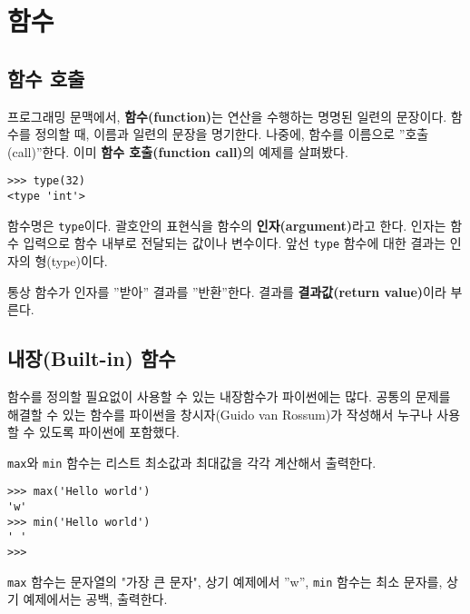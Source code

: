 
\chapter{함수}
\label{funcchap}

\section{함수 호출}
\label{functionchap}

프로그래밍 문맥에서, {\bf 함수(function)}는 연산을 수행하는 명명된 일련의 문장이다. 
함수를 정의할 때, 이름과 일련의 문장을 명기한다. 
나중에, 함수를 이름으로 ''호출(call)''한다.
이미 {\bf 함수 호출(function call)}의 예제를 살펴봤다.

\beforeverb
\begin{verbatim}
>>> type(32)
<type 'int'>
\end{verbatim}
\afterverb
%

함수명은 {\tt type}이다. 
괄호안의 표현식을 함수의 {\bf 인자(argument)}라고 한다. 
인자는 함수 입력으로 함수 내부로 전달되는 값이나 변수이다. 
앞선 {\tt type} 함수에 대한 결과는 인자의 형(type)이다.


통상 함수가 인자를 ''받아'' 결과를 ''반환''한다. 결과를 {\bf 결과값(return value)}이라 부른다.


\section{내장(Built-in) 함수}

함수를 정의할 필요없이 사용할 수 있는 내장함수가 파이썬에는 많다.
공통의 문제를 해결할 수 있는 함수를 파이썬을 창시자(Guido van Rossum)가 작성해서 누구나 사용할 수 있도록 파이썬에 포함했다.

{\tt max}와 {\tt min} 함수는 리스트 최소값과 최대값을 각각 계산해서 출력한다.

\beforeverb
\begin{verbatim}
>>> max('Hello world')
'w'
>>> min('Hello world')
' '
>>>
\end{verbatim}
\afterverb
%

{\tt max} 함수는 문자열의 "가장 큰 문자", 상기 예제에서 ''w'', 
{\tt min} 함수는 최소 문자를, 상기 예제에서는 공백, 출력한다.

